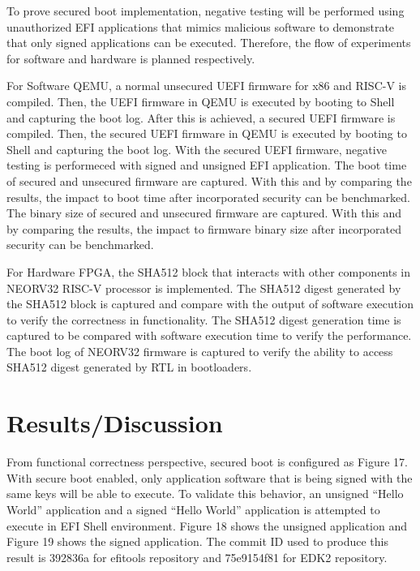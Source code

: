 \documentclass[a4paper,fleqn]{cas-dc}
\begin{document}
To prove secured boot implementation, negative testing will be performed using unauthorized EFI applications that mimics malicious software to demonstrate that only signed applications can be executed. Therefore, the flow of experiments for software and hardware is planned respectively.

For Software QEMU, a normal unsecured UEFI firmware for x86 and RISC-V is compiled. Then, the UEFI firmware in QEMU is executed by booting to Shell and capturing the boot log.
After this is achieved, a secured UEFI firmware is compiled. Then, the secured UEFI firmware in QEMU is executed by booting to Shell and capturing the boot log.
With the secured UEFI firmware, negative testing is performeced with signed and unsigned EFI application.
The boot time of secured and unsecured firmware are captured. With this and by comparing the results, the impact to boot time after incorporated security can be benchmarked.
The binary size of secured and unsecured firmware are captured. With this and by comparing the results, the impact to firmware binary size after incorporated security can be benchmarked.

For Hardware FPGA, the SHA512 block that interacts with other components in NEORV32 RISC-V processor is implemented.
The SHA512 digest generated by the SHA512 block is captured and compare with the output of software execution to verify the correctness in functionality.
The SHA512 digest generation time is captured to be compared with software execution time to verify the performance.
The boot log of NEORV32 firmware is captured to verify the ability to access SHA512 digest generated by RTL in bootloaders.


\section{ Results/Discussion}
From functional correctness perspective, secured boot is configured as Figure 17. With secure boot enabled, only application software that is being signed with the same keys will be able to execute. To validate this behavior, an unsigned “Hello World” application and a signed “Hello World” application is attempted to execute in EFI Shell environment. Figure 18 shows the unsigned application and Figure 19 shows the signed application. The commit ID used to produce this result is 392836a for efitools repository and 75e9154f81 for EDK2 repository.
\end{document}
